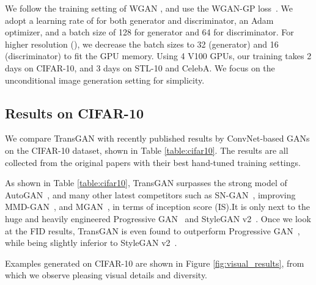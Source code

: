 \documentclass{article}
\begin{document}
We follow the training setting of WGAN \cite{arjovsky2017wasserstein}, and use the WGAN-GP loss~\cite{gulrajani2017improved}. We adopt a learning rate of  for both generator and discriminator, an Adam optimizer, and a batch size of 128 for generator and 64 for discriminator. For higher resolution (), we decrease the batch sizes to 32 (generator) and 16 (discriminator) to fit the GPU memory. 
Using 4 V100 GPUs, our training takes 2 days on CIFAR-10, and 3 days on STL-10 and CelebA. We focus on the unconditional image generation setting for simplicity. 

\subsection{Results on CIFAR-10}
\label{sec:cifar10}
We compare TransGAN with recently published results by ConvNet-based GANs on the CIFAR-10 dataset, shown in Table \ref{table:cifar10}. The results are all collected from the original papers with their best hand-tuned training settings. 

As shown in Table \ref{table:cifar10}, TransGAN surpasses the strong model of AutoGAN~\cite{gong2019autogan}, and many other latest competitors such as SN-GAN~\cite{miyato2018spectral}, improving MMD-GAN~\cite{wang2018improving}, and MGAN~\cite{hoang2018mgan}, in terms of inception score (IS).It is only next to the huge and heavily engineered Progressive GAN~\cite{karras2017progressive} and StyleGAN v2~\cite{karras2020analyzing}. Once we look at the FID results, TransGAN is even found to outperform Progressive GAN~\cite{karras2017progressive}, while being slightly inferior to StyleGAN v2~\cite{karras2020analyzing}. 

Examples generated on CIFAR-10 are shown in Figure \ref{fig:visual_results}, from which we observe pleasing visual details and diversity. 
\end{document}
